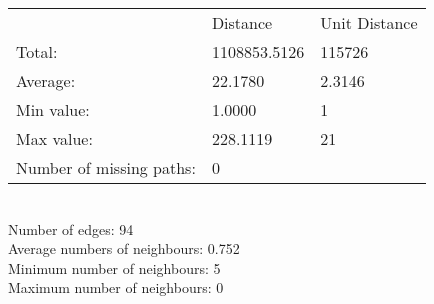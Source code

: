 \begin{tabular}{lll}
 & Distance & Unit Distance\\
Total: & 1108853.5126 & 115726\\
Average: & 22.1780 & 2.3146\\
Min value: & 1.0000 & 1\\
Max value: & 228.1119 & 21\\
\hline
Number of missing paths: & 0 &\\
\end{tabular}\\
Number of edges: 94\\
Average numbers of neighbours: 0.752\\
Minimum number of neighbours: 5\\
Maximum number of neighbours: 0\\
